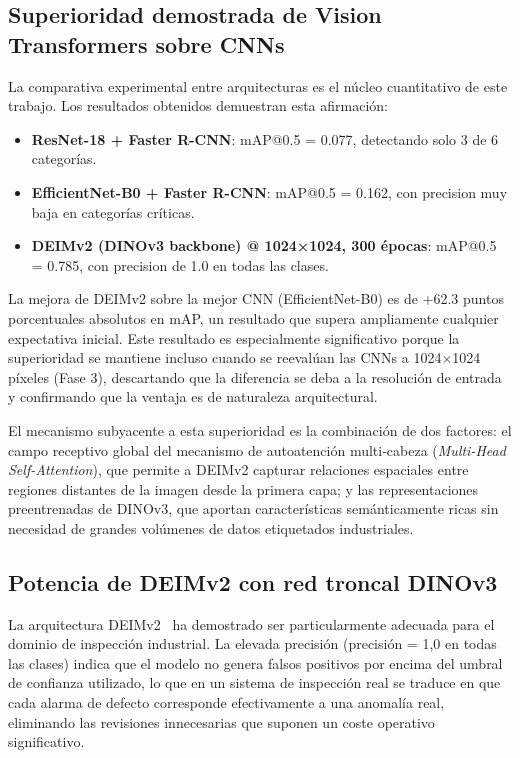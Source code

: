 \subsection{Superioridad demostrada de Vision Transformers sobre CNNs}

La comparativa experimental entre arquitecturas es el núcleo cuantitativo de este trabajo. Los resultados obtenidos demuestran esta afirmación:

\begin{itemize}
    \item \textbf{ResNet-18 + Faster R-CNN}: mAP@0.5 = 0.077, detectando solo 3 de 6 categorías.
    \item \textbf{EfficientNet-B0 + Faster R-CNN}: mAP@0.5 = 0.162, con precision muy baja en categorías críticas.
    \item \textbf{DEIMv2 (DINOv3 backbone) @ 1024×1024, 300 épocas}: mAP@0.5 = 0.785, con precision de 1.0 en todas las clases.
\end{itemize}

La mejora de DEIMv2 sobre la mejor CNN (EfficientNet-B0) es de +62.3 puntos porcentuales absolutos en mAP, un resultado que supera ampliamente cualquier expectativa inicial. Este resultado es especialmente significativo porque la superioridad se mantiene incluso cuando se reevalúan las CNNs a 1024×1024 píxeles (Fase 3), descartando que la diferencia se deba a la resolución de entrada y confirmando que la ventaja es de naturaleza arquitectural.

El mecanismo subyacente a esta superioridad es la combinación de dos factores: el campo receptivo global del mecanismo de autoatención multi‑cabeza (\textit{Multi-Head Self-Attention}), que permite a DEIMv2 capturar relaciones espaciales entre regiones distantes de la imagen desde la primera capa; y las representaciones preentrenadas de \acrshort{DINOv3}, que aportan características semánticamente ricas sin necesidad de grandes volúmenes de datos etiquetados industriales.

\subsection{Potencia de DEIMv2 con red troncal DINOv3}

La arquitectura DEIMv2~\cite{huang2025deimv2} ha demostrado ser particularmente adecuada para el dominio de inspección industrial. La elevada precisión (precisión = 1{,}0 en todas las clases) indica que el modelo no genera falsos positivos por encima del umbral de confianza utilizado, lo que en un sistema de inspección real se traduce en que cada alarma de defecto corresponde efectivamente a una anomalía real, eliminando las revisiones innecesarias que suponen un coste operativo significativo.

